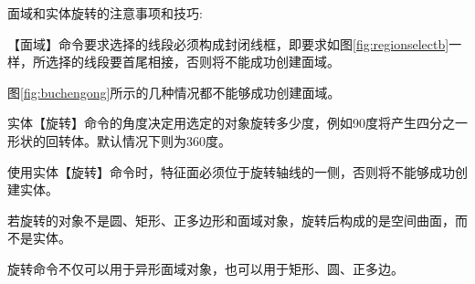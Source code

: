面域和实体旋转的注意事项和技巧:
\begin{tips}
\item 【面域】命令要求选择的线段必须构成封闭线框，即要求如图\ref{fig:regionselectb}一样，所选择的线段要首尾相接，否则将不能成功创建面域。
\item 图\ref{fig:buchengong}所示的几种情况都不能够成功创建面域。

\item 实体【旋转】命令的角度决定用选定的对象旋转多少度，例如90度将产生四分之一形状的回转体。默认情况下则为360度。
\item 使用实体【旋转】命令时，特征面必须位于旋转轴线的一侧，否则将不能够成功创建实体。
\item 若旋转的对象不是圆、矩形、正多边形和面域对象，旋转后构成的是空间曲面，而不是实体。
\item 旋转命令不仅可以用于异形面域对象，也可以用于矩形、圆、正多边。
\end{tips}
\endinput